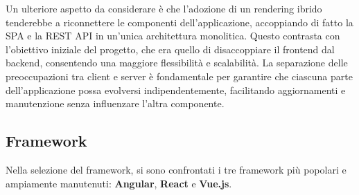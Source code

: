 Un ulteriore aspetto da considerare è che l'adozione di un rendering ibrido tenderebbe a riconnettere le componenti dell'applicazione, accoppiando di fatto la SPA e la REST API in un'unica architettura monolitica. Questo contrasta con l'obiettivo iniziale del progetto, che era quello di disaccoppiare il frontend dal backend, consentendo una maggiore flessibilità e scalabilità. La separazione delle preoccupazioni tra client e server è fondamentale per garantire che ciascuna parte dell'applicazione possa evolversi indipendentemente, facilitando aggiornamenti e manutenzione senza influenzare l'altra componente.

\subsection{Framework}
Nella selezione del framework, si sono confrontati i tre framework più popolari e ampiamente manutenuti: \textbf{Angular}, \textbf{React} e \textbf{Vue.js}.

